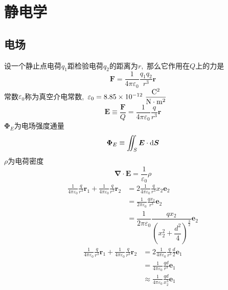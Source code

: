 \cleardoublepage

\section{静电学}
\subsection{电场}
设一个静止点电荷$q_1$距检验电荷$q_2$的距离为$r$, \,那么它作用在$Q$上的力是
\begin{equation}
    \boldsymbol{F}=\frac{1}{4\pi\varepsilon_0}\frac{q_1q_2}{r^3}\boldsymbol{r}
\end{equation}
常数$\varepsilon_0$称为真空介电常数, \,$\varepsilon_0=8.85\times10^{-12}\ \rm{\dfrac{C^2}{N\cdot m^2}}$
\begin{equation}
    \boldsymbol{E}\equiv\frac{\boldsymbol{F}}{Q}=\frac{1}{4\pi\varepsilon_0}\frac{q}{r^3}\boldsymbol{r}
\end{equation}
$\boldsymbol{\Phi }_E$为电场强度通量
\begin{equation}
    \boldsymbol{\Phi }_E\equiv\iint_S\boldsymbol{E}\cdot\dif \boldsymbol{S}
\end{equation}
$\rho$为电荷密度
\begin{equation}
    \boldsymbol{\nabla}\cdot\boldsymbol{E}=\frac{1}{\varepsilon_0}\rho
\end{equation}
\begin{align*}
    \frac{1}{4\pi\varepsilon_0}\frac{q}{r^3}\boldsymbol r_1
    +\frac{1}{4\pi\varepsilon_0}\frac{q}{r^3}\boldsymbol r_2
    &=2\frac{1}{4\pi\varepsilon_0}\frac{q}{r^3}x_2\boldsymbol{e}_2\\
    &=\frac{1}{2\pi\varepsilon_0}\frac{qx_2}{r^3}\boldsymbol{e}_2\\
    &=\dfrac{1}{2\pi\varepsilon_0}\dfrac{qx_2}{(x_2^2+\dfrac{d^2}{4})^\frac{3}{2}}\boldsymbol{e}_2
\end{align*}
\begin{align*}
    \frac{1}{4\pi\varepsilon_0}\frac{q}{r^3}\boldsymbol r_1
    +\frac{1}{4\pi\varepsilon_0}\frac{q}{r^3}\boldsymbol r_2
    &=2\frac{1}{4\pi\varepsilon_0}\frac{q}{r^3}\frac{d}{2}\boldsymbol{e}_1\\
    &=\frac{1}{4\pi\varepsilon_0}\frac{qd}{r^3}\boldsymbol{e}_1\\
    &\approx\frac{1}{4\pi\varepsilon_0}\frac{qd}{x_2^3}\boldsymbol{e}_1
\end{align*}
